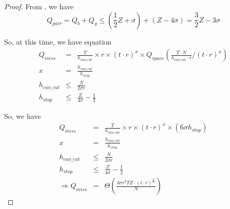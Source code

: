 \begin{proof}
From , we have 
\begin{equation}
Q_{pair} = Q_b + Q_g \leq (\frac{1}{2} Z + \sigma) + (Z - 4 \sigma) = \frac{3}{2} Z - 3 \sigma 
\end{equation}

So, at this time, we have equation
\begin{eqnarray}
Q_{miss} & = & \frac{T}{h_{can\_cut}} \times r \times (t \cdot r)^x \times Q_{space}(\frac{T \cdot N}{h_{can\_cut} \cdot r} / (t \cdot r)^x) \\
x & = & \frac{h_{can\_cut}}{h_{stop}} \\
h_{can\_cut} & \leq & \frac{N}{2 \sigma r} \\
h_{stop} & \leq & \frac{Z}{4 \sigma} - \frac{1}{2}
\end{eqnarray}

So, we have 
\begin{eqnarray}
Q_{miss} & = & \frac{T}{h_{can\_cut}} \times r \times (t \cdot r)^x \times (6 \sigma h_{stop}) \\
x & = & \frac{h_{can\_cut}}{h_{stop}} \\
h_{can\_cut} & \leq & \frac{N}{2 \sigma r} \\
h_{stop} & \leq & \frac{Z}{4 \sigma} - \frac{1}{2} \\
\Rightarrow Q_{miss} & = & \Theta (\frac{3 \sigma r^2 T Z \cdot (t \cdot r)^{\frac{N}{Z}}}{N})
\end{eqnarray}
\end{proof}

